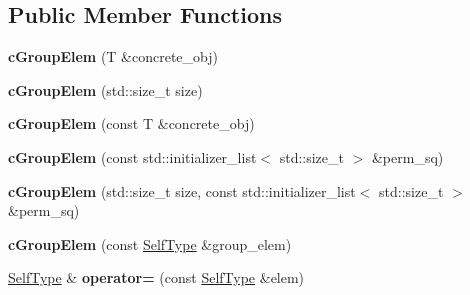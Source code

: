\subsection*{\-Public \-Member \-Functions}
\begin{DoxyCompactItemize}
\item 
\hypertarget{classcGroupElem_ac677380fd35b7307be8230e01c47d24a}{{\bfseries c\-Group\-Elem} (\-T \&concrete\-\_\-obj)}\label{classcGroupElem_ac677380fd35b7307be8230e01c47d24a}

\item 
\hypertarget{classcGroupElem_a0e5fb191a65d35d9cc3865aaef02ce42}{{\bfseries c\-Group\-Elem} (std\-::size\-\_\-t size)}\label{classcGroupElem_a0e5fb191a65d35d9cc3865aaef02ce42}

\item 
\hypertarget{classcGroupElem_a7e61b42847fb382a00025af19baf2132}{{\bfseries c\-Group\-Elem} (const \-T \&concrete\-\_\-obj)}\label{classcGroupElem_a7e61b42847fb382a00025af19baf2132}

\item 
\hypertarget{classcGroupElem_a13a796803737218c08e3d6bb652732d1}{{\bfseries c\-Group\-Elem} (const std\-::initializer\-\_\-list$<$ std\-::size\-\_\-t $>$ \&perm\-\_\-sq)}\label{classcGroupElem_a13a796803737218c08e3d6bb652732d1}

\item 
\hypertarget{classcGroupElem_aaa558bbe798129dccc53712777e1bd4e}{{\bfseries c\-Group\-Elem} (std\-::size\-\_\-t size, const std\-::initializer\-\_\-list$<$ std\-::size\-\_\-t $>$ \&perm\-\_\-sq)}\label{classcGroupElem_aaa558bbe798129dccc53712777e1bd4e}

\item 
\hypertarget{classcGroupElem_af2fe12bf9a1291a5c30905449e2b3a2b}{{\bfseries c\-Group\-Elem} (const \hyperlink{classcGroupElem}{\-Self\-Type} \&group\-\_\-elem)}\label{classcGroupElem_af2fe12bf9a1291a5c30905449e2b3a2b}

\item 
\hypertarget{classcGroupElem_a75d7cd6508130c2632042fa42041b874}{\hyperlink{classcGroupElem}{\-Self\-Type} \& {\bfseries operator=} (const \hyperlink{classcGroupElem}{\-Self\-Type} \&elem)}\label{classcGroupElem_a75d7cd6508130c2632042fa42041b874}


\end{DoxyCompactItemize}
